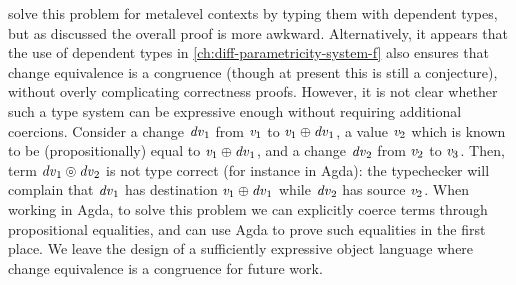 \citet{CaiEtAl2014ILC} solve this problem for metalevel contexts by typing them
with dependent types, but as discussed the overall proof is more awkward.
Alternatively, it appears that the use of dependent types in
\cref{ch:diff-parametricity-system-f} also ensures that change equivalence is a
congruence (though at present this is still a conjecture), without overly
complicating correctness proofs.
However, it is not clear whether such a type system can be
expressive enough without requiring additional coercions.
Consider a change \ensuremath{\Varid{dv}_{1}} from \ensuremath{\Varid{v}_{1}} to \ensuremath{\Varid{v}_{1}\oplus \Varid{dv}_{1}}, a
value \ensuremath{\Varid{v}_{2}} which is known to be (propositionally) equal to \ensuremath{\Varid{v}_{1}\oplus \Varid{dv}_{1}}, and
a change \ensuremath{\Varid{dv}_{2}} from \ensuremath{\Varid{v}_{2}} to \ensuremath{\Varid{v}_{3}}. Then, term \ensuremath{\Varid{dv}_{1}\circledcirc \Varid{dv}_{2}} is not type
correct (for instance in Agda): the typechecker will complain that \ensuremath{\Varid{dv}_{1}} has
destination \ensuremath{\Varid{v}_{1}\oplus \Varid{dv}_{1}} while \ensuremath{\Varid{dv}_{2}} has source \ensuremath{\Varid{v}_{2}}. When working in Agda,
to solve this problem we can explicitly coerce terms through propositional
equalities, and can use Agda to prove such equalities in the first place.
We leave the design of a sufficiently expressive object language where change
equivalence is a congruence for future work.

